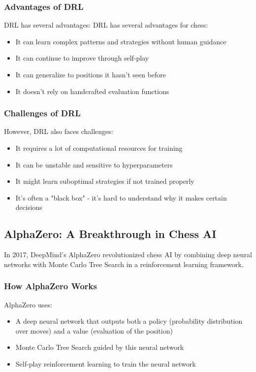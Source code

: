 \documentclass[11pt]{article}
\begin{document}
\subsubsection{Advantages of DRL}

DRL has several advantages:
DRL has several advantages for chess:
\begin{itemize}
    \item It can learn complex patterns and strategies without human guidance
    \item It can continue to improve through self-play
    \item It can generalize to positions it hasn't seen before
    \item It doesn't rely on handcrafted evaluation functions
\end{itemize}

\subsubsection{Challenges of DRL}

However, DRL also faces challenges:
\begin{itemize}
    \item It requires a lot of computational resources for training
    \item It can be unstable and sensitive to hyperparameters
    \item It might learn suboptimal strategies if not trained properly
    \item It's often a "black box" - it's hard to understand why it makes certain decisions
\end{itemize}

\subsection{AlphaZero: A Breakthrough in Chess AI}

In 2017, DeepMind's AlphaZero revolutionized chess AI by combining deep neural networks with Monte Carlo Tree Search in a reinforcement learning framework.

\subsubsection{How AlphaZero Works}

AlphaZero uses:
\begin{itemize}
    \item A deep neural network that outputs both a policy (probability distribution over moves) and a value (evaluation of the position)
    \item Monte Carlo Tree Search guided by this neural network
    \item Self-play reinforcement learning to train the neural network
\end{itemize}
\end{document}
